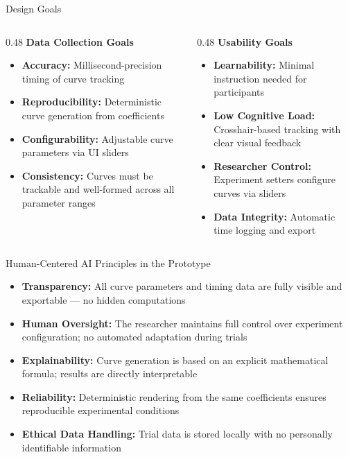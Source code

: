 \documentclass[aspectratio=169, 10pt]{beamer}
\begin{document}
\begin{frame}{Design Goals}
  \begin{columns}[T]
    \begin{column}{0.48\textwidth}
      \textbf{Data Collection Goals}
      \begin{itemize}
        \item \textbf{Accuracy:} Millisecond-precision timing of curve tracking
        \item \textbf{Reproducibility:} Deterministic curve generation from coefficients
        \item \textbf{Configurability:} Adjustable curve parameters via UI sliders
        \item \textbf{Consistency:} Curves must be trackable and well-formed across all parameter ranges
      \end{itemize}
    \end{column}
    \begin{column}{0.48\textwidth}
      \textbf{Usability Goals}
      \begin{itemize}
        \item \textbf{Learnability:} Minimal instruction needed for participants
        \item \textbf{Low Cognitive Load:} Crosshair-based tracking with clear visual feedback
        \item \textbf{Researcher Control:} Experiment setters configure curves via sliders
        \item \textbf{Data Integrity:} Automatic time logging and export
      \end{itemize}
    \end{column}
  \end{columns}
\end{frame}

\begin{frame}{Human-Centered AI Principles in the Prototype}
  \begin{itemize}
    \item \textbf{Transparency:} All curve parameters and timing data are fully visible and exportable --- no hidden computations
    \item \textbf{Human Oversight:} The researcher maintains full control over experiment configuration; no automated adaptation during trials
    \item \textbf{Explainability:} Curve generation is based on an explicit mathematical formula; results are directly interpretable
    \item \textbf{Reliability:} Deterministic rendering from the same coefficients ensures reproducible experimental conditions
    \item \textbf{Ethical Data Handling:} Trial data is stored locally with no personally identifiable information
  \end{itemize}
\end{frame}
\end{document}
